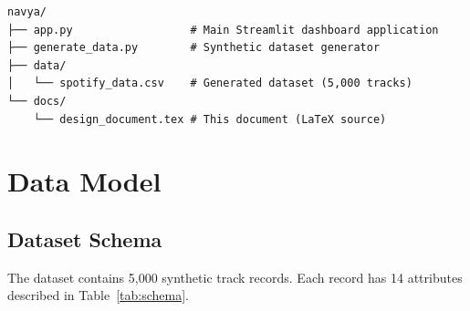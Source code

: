 \documentclass[12pt,a4paper]{article}
\begin{document}
\begin{verbatim}
navya/
├── app.py                  # Main Streamlit dashboard application
├── generate_data.py        # Synthetic dataset generator
├── data/
│   └── spotify_data.csv    # Generated dataset (5,000 tracks)
└── docs/
    └── design_document.tex # This document (LaTeX source)
\end{verbatim}

\section{Data Model}

\subsection{Dataset Schema}

The dataset contains 5{,}000 synthetic track records. Each record has 14 attributes described in Table~\ref{tab:schema}.
\end{document}
